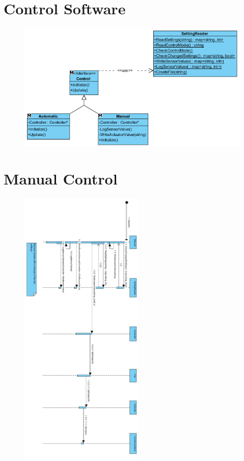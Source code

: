 \documentclass[a4paper,oneside]{book}
\begin{document}
\chapter{Control Software}
\begin{figure}[h]
\centering
\includegraphics[width=\textwidth]{images/control.png}
\end{figure}
\chapter{Manual Control}
\begin{figure}[h]
\centering
\includegraphics[width=0.53\textwidth]{images/manualcontrol.png}
\end{figure}
\end{document}
